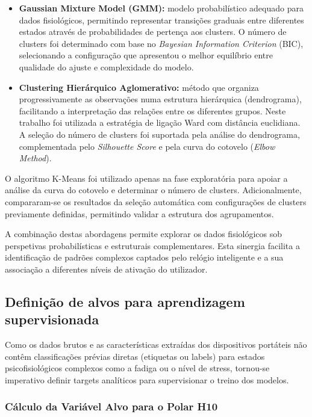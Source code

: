 \begin{itemize}
\item \textbf{Gaussian Mixture Model (GMM):} modelo probabilístico adequado para dados fisiológicos, permitindo representar transições graduais entre diferentes estados através de probabilidades de pertença aos clusters. O número de clusters foi determinado com base no \textit{Bayesian Information Criterion} (BIC), selecionando a configuração que apresentou o melhor equilíbrio entre qualidade do ajuste e complexidade do modelo.
\item \textbf{Clustering Hierárquico Aglomerativo:} método que organiza progressivamente as observações numa estrutura hierárquica (dendrograma), facilitando a interpretação das relações entre os diferentes grupos. Neste trabalho foi utilizada a estratégia de ligação Ward com distância euclidiana. A seleção do número de clusters foi suportada pela análise do dendrograma, complementada pelo \textit{Silhouette Score} e pela curva do cotovelo (\textit{Elbow Method}).
\end{itemize}

O algoritmo K-Means foi utilizado apenas na fase exploratória para apoiar a análise da curva do cotovelo e determinar o número de clusters. Adicionalmente, compararam-se os resultados da seleção automática com configurações de clusters previamente definidas, permitindo validar a estrutura dos agrupamentos.

A combinação destas abordagens permite explorar os dados fisiológicos sob perspetivas probabilísticas e estruturais complementares. Esta sinergia facilita a identificação de padrões complexos captados pelo relógio inteligente e a sua associação a diferentes níveis de ativação do utilizador.

\subsection{Definição de alvos para aprendizagem supervisionada}

Como os dados brutos e as características extraídas dos dispositivos portáteis não contêm classificações prévias diretas (etiquetas ou labels) para estados psicofisiológicos complexos como a fadiga ou o nível de stress, tornou-se imperativo definir targets analíticos para supervisionar o treino dos modelos.

\subsubsection*{Cálculo da Variável Alvo para o Polar H10}
\label{sec:fatigueindex}

